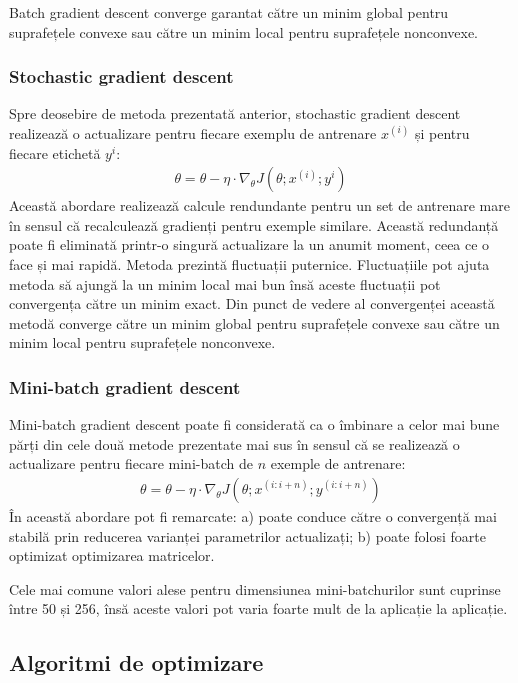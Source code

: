 Batch gradient descent converge garantat către un minim global pentru suprafețele convexe sau către un minim local pentru suprafețele nonconvexe.

\subsubsection{Stochastic gradient descent}
Spre deosebire de metoda prezentată anterior, stochastic gradient descent realizează o actualizare pentru fiecare exemplu de antrenare $x^{(i)}$ și pentru fiecare etichetă $y^{i}$:
\begin{align}
	\theta = \theta - \eta \cdot \nabla_{\theta}J(\theta;x^{(i)};y^{i})
\end{align}
Această abordare realizează calcule rendundante pentru un set de antrenare mare în sensul că recalculează gradienți pentru exemple similare. Această redundanță poate fi eliminată printr-o singură actualizare la un anumit moment, ceea ce o face și mai rapidă. Metoda prezintă fluctuații puternice. Fluctuațiile pot ajuta metoda să ajungă la un minim local mai bun însă aceste fluctuații pot convergența către un minim exact. Din punct de vedere al convergenței această metodă converge către un minim global pentru suprafețele convexe sau către un minim local pentru suprafețele nonconvexe.

\subsubsection{Mini-batch gradient descent}
Mini-batch gradient descent poate fi considerată ca o îmbinare a celor mai bune părți din cele două metode prezentate mai sus în sensul că se realizează o actualizare pentru fiecare mini-batch de $n$ exemple de antrenare:
\begin{align}
	\theta = \theta - \eta \cdot \nabla_{\theta}J(\theta;x^{(i:i+n)};y^{(i:i+n)})
\end{align} 
În această abordare pot fi remarcate: a) poate conduce către o convergență mai stabilă prin reducerea varianței parametrilor actualizați; b) poate folosi foarte optimizat optimizarea matricelor.

Cele mai comune valori alese pentru dimensiunea mini-batchurilor sunt cuprinse între 50 și 256, însă aceste valori pot varia foarte mult de la aplicație la aplicație.

\subsection{Algoritmi de optimizare}
